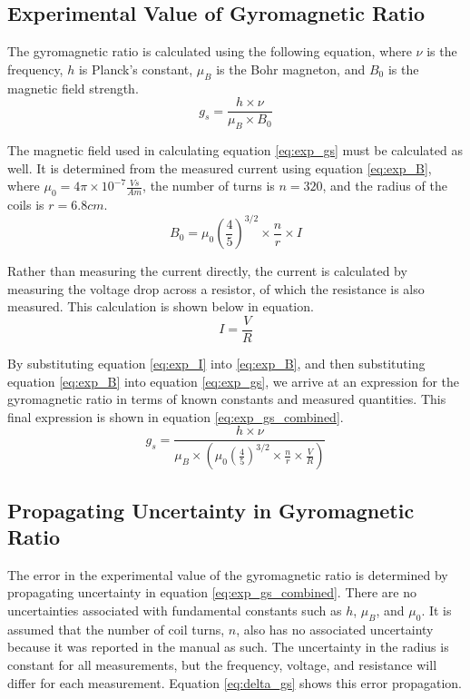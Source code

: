 \documentclass[a4paper]{article}
\begin{document}
\subsection{Experimental Value of Gyromagnetic Ratio}
\qq The gyromagnetic ratio is calculated using the following equation,
where $\nu$ is the frequency, $h$ is Planck's constant, $\mu_B$ is the
Bohr magneton, and $B_0$ is the magnetic field strength.
\begin{equation}
\label{eq:exp_gs}
g_s = \frac{h \times \nu}{\mu_B \times B_0}
\end{equation}

\qq The magnetic field used in calculating equation \ref{eq:exp_gs}
must be calculated as well. It is determined from the measured current
using equation \ref{eq:exp_B}, where $\mu_0 = 4 \pi \times 10^{-7}
\frac{Vs}{Am}$, the number of turns is $n=320$, and the radius of the
coils is $r=6.8cm$.
\begin{equation}
\label{eq:exp_B}
B_0 = \mu_0 \left( \frac{4}{5} \right) ^{3/2} \times \frac{n}{r} \times I
\end{equation}

\qq Rather than measuring the current directly, the current is
calculated by measuring the voltage drop across a resistor, of which
the resistance is also measured. This calculation is shown below in
equation.
\begin{equation}
\label{eq:exp_I}
I = \frac{V}{R}
\end{equation}

\qq By substituting equation \ref{eq:exp_I} into \ref{eq:exp_B}, and
then substituting equation \ref{eq:exp_B} into equation
\ref{eq:exp_gs}, we arrive at an expression for the gyromagnetic ratio
in terms of known constants and measured quantities. This final
expression is shown in equation \ref{eq:exp_gs_combined}.
\begin{equation}
\label{eq:exp_gs_combined}
g_s = \frac{h \times \nu}{\mu_B \times \left( \mu_0 \left( \frac{4}{5}
  \right) ^{3/2} \times \frac{n}{r} \times \frac{V}{R} \right) }
\end{equation}

\subsection{Propagating Uncertainty in Gyromagnetic Ratio}
\qq The error in the experimental value of the gyromagnetic ratio is
determined by propagating uncertainty in equation
\ref{eq:exp_gs_combined}. There are no uncertainties associated with
fundamental constants such as $h$, $\mu_B$, and $\mu_0$. It is assumed
that the number of coil turns, $n$, also has no associated uncertainty
because it was reported in the manual as such. The uncertainty in the
radius is constant for all measurements, but the frequency, voltage,
and resistance will differ for each measurement. Equation
\ref{eq:delta_gs} shows this error propagation.
\end{document}
